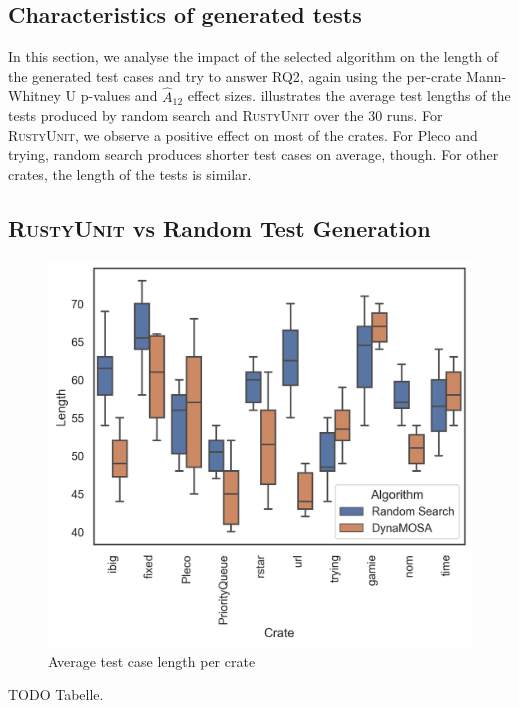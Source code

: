 \documentclass[paper=a4,%
  twoside,%
  BCOR4mm,%
  abstract=true,%
  toc=bibliography,%
  chapterprefix=true,%
  toc=bibliographynumbered,%
  open=right,%
  english,%
  pagesize=pdftex]{scrreprt}
\newcommand{\tech}{\textsc{RustyUnit}\xspace}
\newcommand{\runs}{30\xspace}
\begin{document}
\subsection{Characteristics of generated tests}
In this section, we analyse the impact of the selected algorithm on the length of the generated test cases and try to answer RQ2, again using the per-crate Mann-Whitney U p-values and $\hat{A}_{12}$ effect sizes.  illustrates the average test lengths of the tests produced by random search and \tech over the \runs runs. For \tech, we observe a positive effect on most of the crates. For Pleco and  trying, random search produces shorter test cases on average, though. For other crates, the length of the tests is similar.  
\subsection{\tech vs Random Test Generation}
\begin{figure}[ht]
\caption{\label{fig:results-ru-rs-length}Average test case length per crate}
\centering
\includegraphics[width=\textwidth]{length}
\end{figure}

TODO Tabelle.
\end{document}
